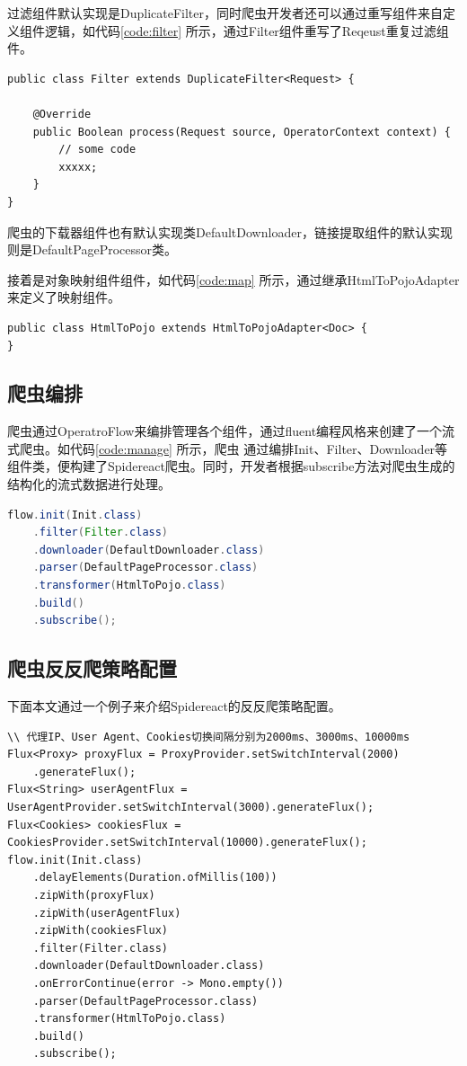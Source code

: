 \documentclass[master]{njuthesis}
\begin{document}
过滤组件默认实现是DuplicateFilter，同时爬虫开发者还可以通过重写组件来自定义组件逻辑，如代码\ref{code:filter} 所示，通过Filter组件重写了Reqeust重复过滤组件。
\begin{lstlisting}[label = code:filter, caption = {Filter组件定义}]
public class Filter extends DuplicateFilter<Request> {
  
    @Override
    public Boolean process(Request source, OperatorContext context) {
        // some code
        xxxxx;
    }
}
\end{lstlisting}

爬虫的下载器组件也有默认实现类DefaultDownloader，链接提取组件的默认实现则是DefaultPageProcessor类。

接着是对象映射组件组件，如代码\ref{code:map} 所示，通过继承HtmlToPojoAdapter来定义了映射组件。
\begin{lstlisting}[label = code:map, caption = {映射组件定义}]
public class HtmlToPojo extends HtmlToPojoAdapter<Doc> {
}
\end{lstlisting}


\subsection{爬虫编排}

爬虫通过OperatroFlow来编排管理各个组件，通过fluent编程风格来创建了一个流式爬虫。如代码\ref{code:manage} 所示，爬虫
通过编排Init、Filter、Downloader等组件类，便构建了Spidereact爬虫。同时，开发者根据subscribe方法对爬虫生成的结构化的流式数据进行处理。
\begin{lstlisting}[language=Java, label = code:manage, caption = {爬虫编排}]
flow.init(Init.class)
    .filter(Filter.class)
    .downloader(DefaultDownloader.class)
    .parser(DefaultPageProcessor.class)
    .transformer(HtmlToPojo.class)
    .build()
    .subscribe();
\end{lstlisting}

\subsection{爬虫反反爬策略配置}
下面本文通过一个例子来介绍Spidereact的反反爬策略配置。
\begin{lstlisting}[label = code:anti, caption = {爬虫反反爬策略配置}]
\\ 代理IP、User Agent、Cookies切换间隔分别为2000ms、3000ms、10000ms
Flux<Proxy> proxyFlux = ProxyProvider.setSwitchInterval(2000)
    .generateFlux();
Flux<String> userAgentFlux = UserAgentProvider.setSwitchInterval(3000).generateFlux();
Flux<Cookies> cookiesFlux = CookiesProvider.setSwitchInterval(10000).generateFlux();
flow.init(Init.class)
    .delayElements(Duration.ofMillis(100))
    .zipWith(proxyFlux)
    .zipWith(userAgentFlux)
    .zipWith(cookiesFlux)
    .filter(Filter.class)
    .downloader(DefaultDownloader.class)
    .onErrorContinue(error -> Mono.empty())
    .parser(DefaultPageProcessor.class)
    .transformer(HtmlToPojo.class)
    .build()
    .subscribe();
\end{lstlisting}
\end{document}
